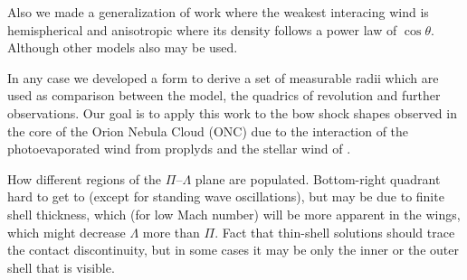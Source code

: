 Also we made a generalization of \CRW{} work where the weakest interacing wind is hemispherical and anisotropic where its
density follows a power law of $\cos\theta$. Although other models also may be used.

In any case we developed a form to derive a set of measurable radii which are used as comparison between the \CRW{} model, the quadrics
of revolution and further observations. Our goal is to apply this work to the bow shock shapes observed in the core of the Orion Nebula Cloud
(ONC) due to the interaction of the photoevaporated wind from proplyds and the stellar wind of \thC{}.


How different regions of the \(\Pi\)--\(\Lambda\) plane are populated.
Bottom-right quadrant hard to get to (except for standing wave
oscillations), but may be due to finite shell thickness, which (for
low Mach number) will be more apparent in the wings, which might
decrease \(\Lambda\) more than \(\Pi\).  Fact that thin-shell solutions should
trace the contact discontinuity, but in some cases it may be only the
inner or the outer shell that is visible.




